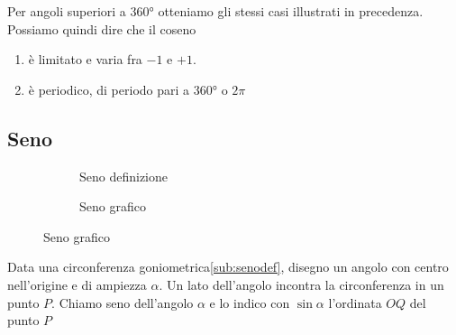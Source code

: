 Per angoli superiori a \ang{360} otteniamo gli stessi casi illustrati in precedenza. 
Possiamo quindi dire che il coseno
\begin{enumerate}
	\item è limitato e varia fra $-1$ e $+1$.
	\item è periodico, di periodo pari a \ang{360} o $2\pi$
	\end{enumerate} 
\begin{figure}
		\centering

		\label{fig:AndamentoCoseno1}
	\end{figure}%
	\begin{figure}
		\centering

		\label{fig:AndamentoCoseno2}
\end{figure}
\subsection{Seno}
\label{sec:senogonio}
\begin{figure}
	\begin{subfigure}[b]{.5\linewidth}
		\centering
			
		\caption{Seno definizione}\label{sub:senodef}
	\end{subfigure}%
	\begin{subfigure}[b]{.5\linewidth}
		\centering
		
		\caption{Seno grafico}\label{sub:senograf}
	\end{subfigure}
	\label{tab:funseno}
\end{figure}
\begin{definizione}[Seno]
	Data una circonferenza goniometrica\nobs\vref{sub:senodef}, disegno un angolo con centro nell'origine e di ampiezza $\alpha$. Un lato dell'angolo incontra la circonferenza in un punto $P$.  Chiamo seno dell'angolo $\alpha$ e lo indico con $\sin\alpha$ l'ordinata $OQ$  del punto $P$
\end{definizione}
